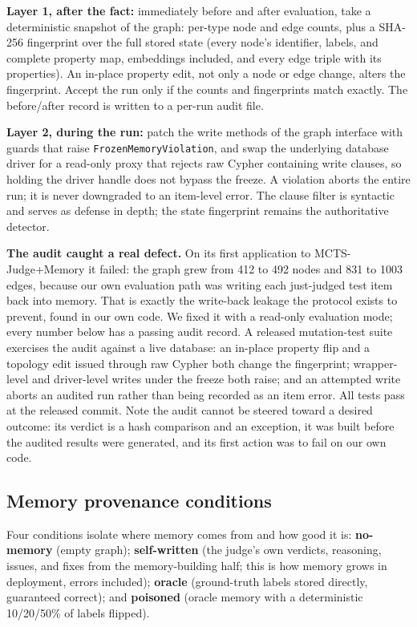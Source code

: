 \documentclass[]{ceurart}
\begin{document}
\textbf{Layer 1, after the fact:} immediately before and after evaluation, take a deterministic snapshot of the graph: per-type node and edge counts, plus a SHA-256 fingerprint over the full stored state (every node's identifier, labels, and complete property map, embeddings included, and every edge triple with its properties). An in-place property edit, not only a node or edge change, alters the fingerprint. Accept the run only if the counts and fingerprints match exactly. The before/after record is written to a per-run audit file.

\textbf{Layer 2, during the run:} patch the write methods of the graph interface with guards that raise \texttt{FrozenMemoryViolation}, and swap the underlying database driver for a read-only proxy that rejects raw Cypher containing write clauses, so holding the driver handle does not bypass the freeze. A violation aborts the entire run; it is never downgraded to an item-level error. The clause filter is syntactic and serves as defense in depth; the state fingerprint remains the authoritative detector.

\textbf{The audit caught a real defect.} On its first application to MCTS-Judge+Memory it failed: the graph grew from 412 to 492 nodes and 831 to 1003 edges, because our own evaluation path was writing each just-judged test item back into memory. That is exactly the write-back leakage the protocol exists to prevent, found in our own code. We fixed it with a read-only evaluation mode; every number below has a passing audit record. A released mutation-test suite exercises the audit against a live database: an in-place property flip and a topology edit issued through raw Cypher both change the fingerprint; wrapper-level and driver-level writes under the freeze both raise; and an attempted write aborts an audited run rather than being recorded as an item error. All tests pass at the released commit. Note the audit cannot be steered toward a desired outcome: its verdict is a hash comparison and an exception, it was built before the audited results were generated, and its first action was to fail on our own code.

\subsection{Memory provenance conditions}

Four conditions isolate where memory comes from and how good it is: \textbf{no-memory} (empty graph); \textbf{self-written} (the judge's own verdicts, reasoning, issues, and fixes from the memory-building half; this is how memory grows in deployment, errors included); \textbf{oracle} (ground-truth labels stored directly, guaranteed correct); and \textbf{poisoned} (oracle memory with a deterministic 10/20/50\% of labels flipped).
\end{document}
